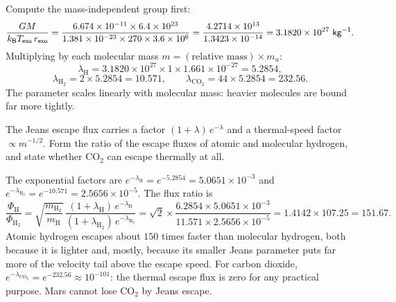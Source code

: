 \begin{solution}
Compute the mass-independent group first:
\[
\frac{GM}{k_{\mathsf{B}} T_\mathsf{exo}\,r_\mathsf{exo}}
= \frac{6.674\times10^{-11} \times 6.4\times10^{23}}{1.381\times10^{-23} \times 270 \times 3.6\times10^{6}}
= \frac{4.2714\times10^{13}}{1.3423\times10^{-14}} = 3.1820\times10^{27}\ \mathsf{kg^{-1}}.
\]
Multiplying by each molecular mass $m = (\text{relative mass}) \times m_u$:
\[
\lambda_\mathrm{H} = 3.1820\times10^{27} \times 1 \times 1.661\times10^{-27} = 5.2854,
\]
\[
\lambda_{\mathrm{H_2}} = 2 \times 5.2854 = 10.571,
\qquad
\lambda_{\mathrm{CO_2}} = 44 \times 5.2854 = 232.56.
\]
The parameter scales linearly with molecular mass: heavier molecules are bound far more tightly.
\end{solution}

\parti The Jeans escape flux carries a factor $(1 + \lambda)\,e^{-\lambda}$ and a thermal-speed factor $\propto m^{-1/2}$.
Form the ratio of the escape fluxes of atomic and molecular hydrogen,
and state whether $\mathrm{CO_2}$ can escape thermally at all.

\begin{solution}
The exponential factors are $e^{-\lambda_\mathrm{H}} = e^{-5.2854} = 5.0651\times10^{-3}$
and $e^{-\lambda_{\mathrm{H_2}}} = e^{-10.571} = 2.5656\times10^{-5}$. The flux ratio is
\[
\frac{\Phi_\mathrm{H}}{\Phi_{\mathrm{H_2}}}
= \sqrt{\frac{m_{\mathrm{H_2}}}{m_\mathrm{H}}}\,\frac{(1 + \lambda_\mathrm{H})\,e^{-\lambda_\mathrm{H}}}{(1 + \lambda_{\mathrm{H_2}})\,e^{-\lambda_{\mathrm{H_2}}}}
= \sqrt{2} \times \frac{6.2854 \times 5.0651\times10^{-3}}{11.571 \times 2.5656\times10^{-5}}
= 1.4142 \times 107.25 = 151.67.
\]
Atomic hydrogen escapes about $150$ times faster than molecular hydrogen,
both because it is lighter and, mostly, because its smaller Jeans parameter puts far more of the velocity tail above the escape speed.
For carbon dioxide, $e^{-\lambda_{\mathrm{CO_2}}} = e^{-232.56} \approx 10^{-101}$:
the thermal escape flux is zero for any practical purpose.
Mars cannot lose $\mathrm{CO_2}$ by Jeans escape.
\end{solution}

